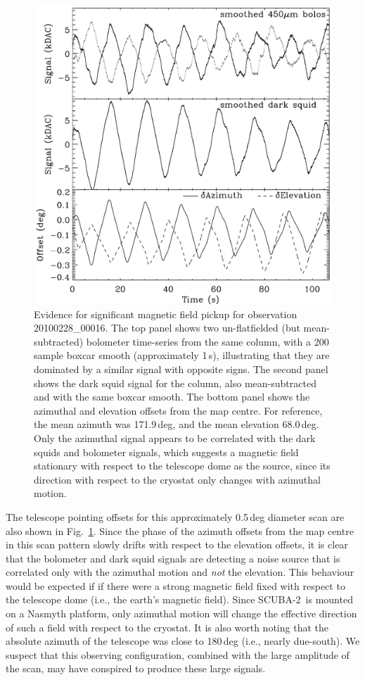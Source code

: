 \documentclass[useAMS,usenatbib,nofootinbib]{mn2e}
\newcommand{\scuba}{SCUBA-2}
\begin{document}
\begin{figure}
\centering
\includegraphics[width=\linewidth]{magpickup.pdf}
\caption{Evidence for significant magnetic field pickup for
  observation 20100228\_00016.  The top panel shows two un-flatfielded
  (but mean-subtracted) bolometer time-series from the same column,
  with a 200 sample boxcar smooth (approximately 1\,s), illustrating
  that they are dominated by a similar signal with opposite signs. The
  second panel shows the dark squid signal for the column, also
  mean-subtracted and with the same boxcar smooth. The bottom panel
  shows the azimuthal and elevation offsets from the map centre. For
  reference, the mean azimuth was 171.9\,deg, and the mean elevation
  68.0\,deg. Only the azimuthal signal appears to be correlated with
  the dark squids and bolometer signals, which suggests a magnetic
  field stationary with respect to the telescope dome as the source,
  since its direction with respect to the cryostat only changes with
  azimuthal motion.}
\label{fig:magpickup}
\end{figure}

The telescope pointing offsets for this approximately 0.5\,deg
diameter scan are also shown in Fig.~\ref{fig:magpickup}. Since the
phase of the azimuth offsets from the map centre in this scan pattern
slowly drifts with respect to the elevation offsets, it is clear that
the bolometer and dark squid signals are detecting a noise source that
is correlated only with the azimuthal motion and \emph{not} the
elevation. This behaviour would be expected if if there were a strong
magnetic field fixed with respect to the telescope dome (i.e., the
earth's magnetic field). Since \scuba\ is mounted on a Nasmyth
platform, only azimuthal motion will change the effective direction of
such a field with respect to the cryostat. It is also worth noting
that the absolute azimuth of the telescope was close to 180\,deg
(i.e., nearly due-south). We suspect that this observing
configuration, combined with the large amplitude of the scan, may have
conspired to produce these large signals.
\end{document}
